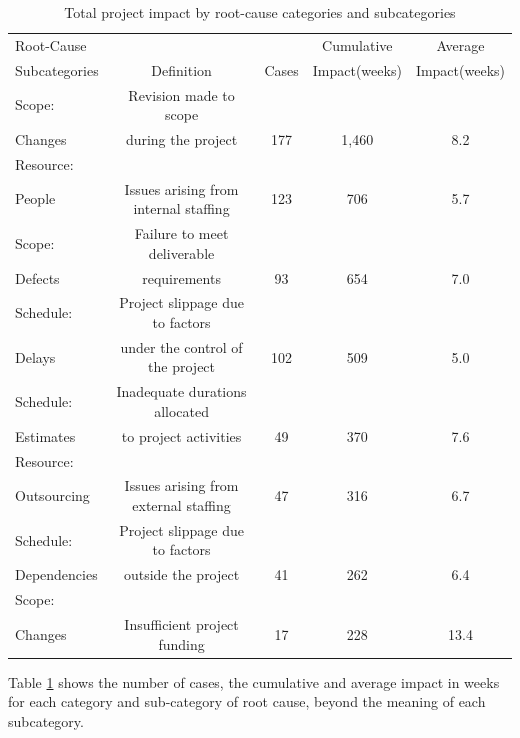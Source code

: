 \begin{table}[h]
\caption{Total project impact by root-cause categories and subcategories \cite{KEND2003BOOK}}\label{tab:peril_pareto} \centering
\begin{tabular}{|l|c|c|c|c|}
 \hline
 Root-Cause & & &Cumulative &Average \\
 Subcategories &Definition &Cases &Impact(weeks) &Impact(weeks) \\
 \hline
  Scope: & Revision made to scope &  &  &  \\
  Changes & during the project & 177 & 1,460 & 8.2 \\
 \hline
  Resource: &  &  &  &  \\
  People & Issues arising from internal staffing & 123 & 706 & 5.7 \\
 \hline
  Scope: & Failure to meet deliverable &  &  &  \\
  Defects & requirements & 93 & 654 & 7.0 \\
 \hline
  Schedule: & Project slippage due to factors &  &  &  \\
  Delays & under the control of the project & 102 & 509 & 5.0 \\
 \hline
  Schedule: & Inadequate durations allocated &  &  &  \\
  Estimates & to project activities & 49 & 370 & 7.6 \\
 \hline
  Resource: &  &  &  &  \\
  Outsourcing & Issues arising from external staffing & 47 & 316 & 6.7 \\
 \hline
  Schedule: & Project slippage due to factors &  &  &  \\
  Dependencies & outside the project & 41 & 262 & 6.4 \\
 \hline
  Scope: &  &  &  &  \\
  Changes & Insufficient project funding & 17 & 228 & 13.4 \\
 \hline
\end{tabular}
\end{table}

Table \ref{tab:peril_pareto} shows the number of cases, the cumulative and average impact in weeks for each category and sub-category of root cause, beyond the meaning of each subcategory.

